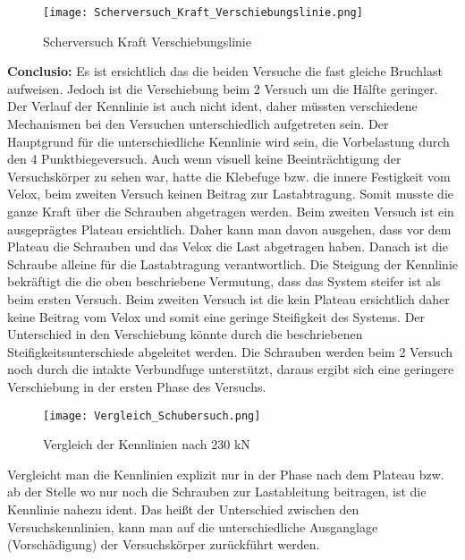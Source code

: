 \documentclass[12 pt,a4 paper ]{scrreprt}
\begin{document}
\begin{figure}
\begin{center}
\texttt{[image: Scherversuch\_Kraft\_Verschiebungslinie.png]}
\caption{Scherversuch Kraft Verschiebungslinie}
\label{Scherversuch Kraft Verschiebungslinie}
\end{center}
\end{figure}


\textbf{Conclusio:}
Es ist ersichtlich das die beiden Versuche die fast gleiche Bruchlast aufweisen. Jedoch ist die Verschiebung beim 2 Versuch um die Hälfte geringer. Der Verlauf der Kennlinie ist auch nicht ident, daher müssten verschiedene Mechanismen bei den  Versuchen unterschiedlich aufgetreten sein. 
Der Hauptgrund für die unterschiedliche Kennlinie wird sein, die Vorbelastung durch den  4 Punktbiegeversuch. Auch wenn visuell keine Beeinträchtigung der Versuchskörper zu sehen war, hatte die Klebefuge bzw. die innere Festigkeit vom Velox, beim zweiten Versuch keinen Beitrag zur Lastabtragung. Somit musste die ganze Kraft über die Schrauben abgetragen werden.  Beim zweiten Versuch ist ein ausgeprägtes Plateau ersichtlich. Daher kann man davon ausgehen, dass vor dem Plateau die Schrauben und das Velox die Last abgetragen haben. Danach ist die Schraube alleine für die Lastabtragung verantwortlich. Die Steigung der Kennlinie bekräftigt die die oben beschriebene Vermutung, dass das System steifer ist als beim ersten Versuch. Beim zweiten Versuch ist die kein Plateau ersichtlich daher keine Beitrag vom Velox und somit eine geringe Steifigkeit des Systems.
Der Unterschied in den Verschiebung könnte durch die beschriebenen Steifigkeitsunterschiede abgeleitet werden. Die Schrauben werden beim 2 Versuch noch durch die intakte Verbundfuge 
unterstützt, daraus ergibt sich eine geringere Verschiebung in der ersten Phase des Versuchs.



\begin{figure}
\begin{center}
\texttt{[image: Vergleich\_Schubersuch.png]}
\caption{Vergleich der Kennlinien nach 230 kN}
\label{VergleichSchubersuch}
\end{center}
\end{figure}

Vergleicht man die Kennlinien explizit nur in der Phase nach dem Plateau bzw. ab der Stelle wo nur noch die Schrauben zur Lastableitung beitragen, ist die Kennlinie nahezu ident. Das heißt der Unterschied zwischen den Versuchskennlinien, kann man auf die unterschiedliche Ausganglage (Vorschädigung) der Versuchskörper zurückführt werden. 
\end{document}
